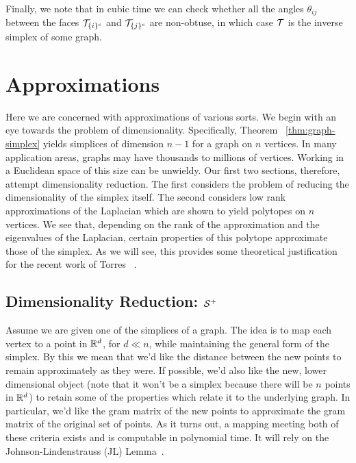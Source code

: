 Finally, we note that in cubic time we can check whether all the angles $\theta_{ij}$ between the faces $\mathcal{T}_{\{i\}^c}$ and $\mathcal{T}_{\{j\}^c}$ are non-obtuse, in which case $\mathcal{T}$ is the inverse simplex of some graph. 


\section{Approximations} 
\label{sec:algorithmics_approximations}
Here we are concerned  with  approximations of various sorts. We begin  with an eye towards the problem of  dimensionality. Specifically, Theorem ~\ref{thm:graph-simplex} yields simplices of dimension $n-1$ for a graph on $n$ vertices. In  many application areas, graphs may have thousands  to  millions of vertices. Working in a Euclidean space  of  this  size can be unwieldy. Our first two  sections,  therefore, attempt dimensionality reduction. The first  considers the problem of reducing the dimensionality of the simplex itself. The second considers low rank approximations of  the Laplacian which are  shown to yield polytopes on  $n$ vertices. We see that, depending on the rank of the  approximation and the eigenvalues of the Laplacian, certain properties of this polytope approximate  those of the simplex. As we will see, this provides some  theoretical justification for  the  recent work of Torres \etal~\cite{torres2019geometric}. 

\subsection{Dimensionality  Reduction: \texorpdfstring{$\mathcal{S}^+$}{the inverse simplex}}
\label{sec:algorithmics_JL}
Assume we are given one of the simplices of a  graph.  
The idea is to  map each vertex to a  point in $\mathbb{R}^d$, for $d\ll n$, while maintaining the general form of the simplex. By this we mean that we'd like the distance between the new  points  to remain approximately  as they  were. If possible, we'd also  like the new, lower  dimensional  object (note that it won't  be  a simplex because there will  be  $n$ points in $ \mathbb{R}^d$) to retain some of the properties which  relate it  to the underlying graph. In  particular, we'd like the gram matrix  of the new  points to  approximate the gram  matrix of the original  set  of points. As it turns out,  a  mapping meeting both  of these criteria exists and is computable  in polynomial time. It will   rely on the Johnson-Lindenstrauss  (JL) Lemma~\cite{johnson1984extensions,dasgupta2003elementary}. 


